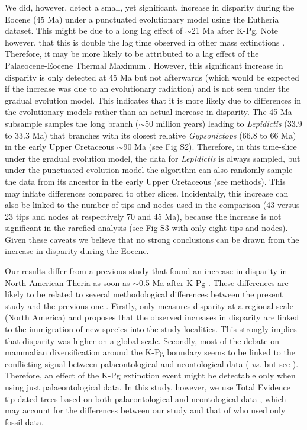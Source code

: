 \documentclass[10pt,letterpaper]{article}
\begin{document}
We did, however, detect a small, yet significant, increase in disparity during the Eocene (45 Ma) under a punctuated evolutionary model using the Eutheria dataset.
This might be due to a long lag effect of $\sim$21 Ma after K-Pg.
Note however, that this is double the lag time observed in other mass extinctions \citep{chen2012timing}.
Therefore, it may be more likely to be attributed to a lag effect of the Palaeocene-Eocene Thermal Maximum \citep[PETM; $\sim$11 Ma afterwards;][]{bininda2007delayed}.
However, this significant increase in disparity is only detected at 45 Ma but not afterwards (which would be expected if the increase was due to an evolutionary radiation) and is not seen under the gradual evolution model.
This indicates that it is more likely due to differences in the evolutionary models rather than an actual increase in disparity.
The 45 Ma subsample samples the long branch ($\sim$50 million years) leading to \textit{Lepidictis} (33.9 to 33.3 Ma) that branches with its closest relative \textit{Gypsonictops} (66.8 to 66 Ma) in the early Upper Cretaceous $\sim$90 Ma (see Fig S2).
Therefore, in this time-slice under the gradual evolution model, the data for \textit{Lepidictis} is always sampled, but under the punctuated evolution model the algorithm can also randomly sample the data from its ancestor in the early Upper Cretaceous (see methods).
This may inflate differences compared to other slices.
Incidentally, this increase can also be linked to the number of tips and nodes used in the comparison (43 versus 23 tips and nodes at respectively 70 and 45 Ma), because the increase is not significant in the rarefied analysis (see Fig S3 with only eight tips and nodes).
Given these caveats we believe that no strong conclusions can be drawn from the increase in disparity during the Eocene.

Our results differ from a previous study that found an increase in disparity in North American Theria as soon as $\sim$0.5 Ma after K-Pg \citep{Wilson2013}.
These differences are likely to be related to several methodological differences between the present study and the previous one \citep{Wilson2013}.
Firstly, \cite{Wilson2013} only measures disparity at a regional scale (North America) and proposes that the observed increases in disparity are linked to the immigration of new species into the study localities.
This strongly implies that disparity was higher on a global scale.
Secondly, most of the debate on mammalian diversification around the K-Pg boundary seems to be linked to the conflicting signal between palaeontological and neontological data (\citealt{meredithimpacts2011} \textit{vs.} \citealt{O'Leary08022013} but see \citealt{dosReis2014}).
Therefore, an effect of the K-Pg extinction event might be detectable only when using just palaeontological data.
In this study, however, we use Total Evidence tip-dated trees based on both palaeontological and neontological data \citep{Slater2012MEE,beckancient2014}, which may account for the differences between our study and that of \cite{Wilson2013} who used only fossil data.
\end{document}
